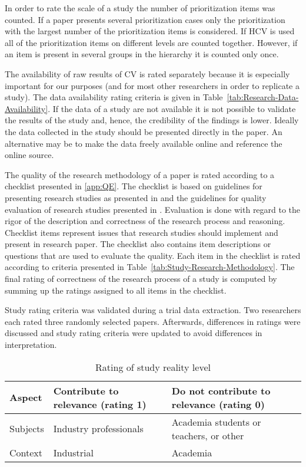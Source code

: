 In order to rate the scale of a study the number of prioritization items was counted.
If a paper presents several prioritization cases only the prioritization with the largest number of the prioritization items is considered.
If HCV is used all of the prioritization items on different levels are counted together. However, if an item is present in several groups in the hierarchy it is counted only once.

The availability of raw results of CV is rated separately because it is especially important for our purposes (and for most other researchers in order to replicate a study). The data availability rating criteria is given in Table~\ref{tab:Research-Data-Availability}. If the data of a study are not available it is not possible to validate the results of the study and, hence, the credibility of the findings is lower. Ideally the data collected in the study should be presented directly in the paper. An alternative may be to make the data freely available online and reference the online source.

The quality of the research methodology of a paper is rated according to a checklist presented in \ref{app:QE}. The checklist is based on guidelines for presenting research studies as presented in \citep{Wohlin2000,Jedlitschka2005} and the guidelines for quality evaluation of research studies presented in \citep{Ivarsson2010,Kitchenham2007}. Evaluation is done with regard to the rigor of the description and correctness of the research process and reasoning. Checklist items represent issues that research studies should implement and present in research paper. The checklist also contains item descriptions or questions that are used to evaluate the quality. Each item in the checklist is rated according to criteria presented in Table~\ref{tab:Study-Research-Methodology}. The final rating of correctness of the research process of a study is computed by summing up the ratings assigned to all items in the checklist.

Study rating criteria was validated during a trial data extraction. Two researchers each rated three randomly selected papers. Afterwards, differences in ratings were discussed and study rating criteria were updated to avoid differences in interpretation.

\begin{table}
	\scriptsize
\caption{\label{tab:Study-Setting-Rating}Rating of study reality level}
\begin{tabular}{|>{\centering}p{}|>{\centering}p{}|>{\centering}p{}|}
\hline 
Aspect & Contribute to relevance (rating 1) & Do not contribute to relevance (rating 0)\tabularnewline
\hline\hline
Subjects & Industry professionals & Academia students or teachers, or other\tabularnewline
\hline 
Context & Industrial & Academia\tabularnewline
\hline 
\end{tabular}%
\end{table}

